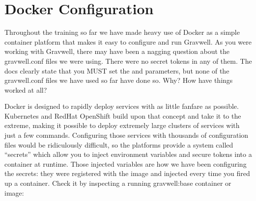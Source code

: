 %
%
%

\section{Docker Configuration}
\label{sec:docker-config}
Throughout the training so far we have made heavy use of Docker as a
simple container platform that makes it easy to configure and run
Gravwell. As you were working with Gravwell, there may have been a
nagging question about the gravwell.conf files we were using. There
were no secret tokens in any of them. The docs clearly state that you
MUST set the  and  parameters, but none of the
gravwell.conf files we have used so far have done so. Why? How have things
worked at all?

Docker is designed to rapidly deploy services with as little fanfare as
possible. Kubernetes and RedHat OpenShift build upon that concept and
take it to the extreme, making it possible to deploy extremely large
clusters of services with just a few commands. Configuring those
services with thousands of configuration files would be ridiculously
difficult, so the platforms provide a system called ``secrets'' which
allow you to inject environment variables and secure tokens into a
container at runtime. Those injected variables are how we have been
configuring the secrets: they were registered with the image and
injected every time you fired up a container. Check it by inspecting a
running gravwell:base container or image:

